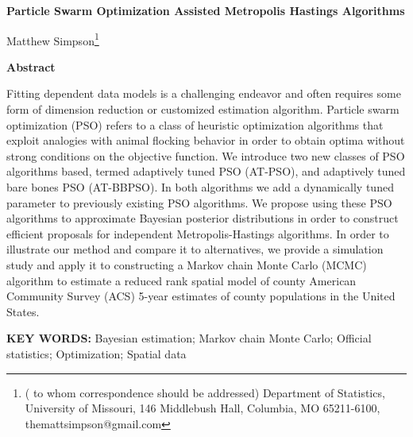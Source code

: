 \documentclass[12pt]{article}
\begin{document}
\thispagestyle{empty} \baselineskip=28pt

\begin{center}
{\LARGE{\bf Particle Swarm Optimization Assisted Metropolis Hastings Algorithms}}
\end{center}

\baselineskip=12pt
\vskip 2mm
\begin{center}
Matthew Simpson\footnote{(\baselineskip=10pt to whom correspondence should be addressed)
Department of Statistics, University of Missouri,
146 Middlebush Hall, Columbia, MO 65211-6100, themattsimpson@gmail.com}
\end{center}

\vskip 2mm
\begin{center}
{\large{\bf Abstract}}
\end{center}
Fitting dependent data models is a challenging endeavor and often requires some form of dimension reduction or customized estimation algorithm. Particle swarm optimization (PSO) refers to a class of heuristic optimization algorithms that exploit analogies with animal flocking behavior in order to obtain optima without strong conditions on the objective function. We introduce two new classes of PSO algorithms based, termed adaptively tuned PSO (AT-PSO), and adaptively tuned bare bones PSO (AT-BBPSO). In both algorithms we add a dynamically tuned parameter to previously existing PSO algorithms. We propose using these PSO algorithms to approximate Bayesian posterior distributions in order to construct efficient proposals for independent Metropolis-Hastings algorithms. In order to illustrate our method and compare it to alternatives, we provide a simulation study and apply it to constructing a Markov chain Monte Carlo (MCMC) algorithm to estimate a reduced rank spatial model of county American Community Survey (ACS) 5-year estimates of county populations in the United States.
\baselineskip=12pt 

\baselineskip=12pt
\par\vfill\noindent
{\bf KEY WORDS:} 
Bayesian estimation; Markov chain Monte Carlo; Official statistics; Optimization; Spatial data
\par\medskip\noindent
\end{document}
